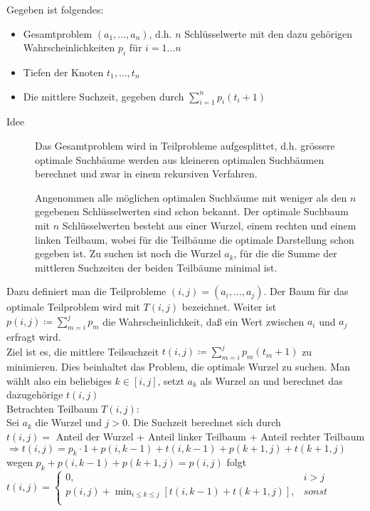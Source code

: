\documentclass[ngerman,draft,parskip=half*,twoside]{scrreprt}
\theoremstyle{break}
\theoremstyle{nonumberbreak}
\begin{document}
Gegeben ist folgendes:
\begin{itemize}
    \item Gesamtproblem $(a_1, \dots,a_n)$, d.h. $n$ Schlüsselwerte mit den dazu gehörigen Wahrscheinlichkeiten $p_i$ für $i=1 \dots n$
    \item Tiefen der Knoten $t_1,\dots,t_n$
    \item Die mittlere Suchzeit, gegeben durch $\sum_{i=1}^n p_i(t_i+1)$
\end{itemize}
\begin{description}
    \item[Idee] Das Gesamtproblem wird in Teilprobleme aufgesplittet, d.h. grössere optimale Suchbäume werden
     aus kleineren optimalen Suchbäumen  berechnet und zwar in einem rekursiven Verfahren.
     
     Angenommen alle möglichen optimalen Suchbäume mit weniger als den $n$ gegebenen Schlüsselwerten sind schon bekannt.
     Der optimale Suchbaum mit $n$ Schlüsselwerten besteht aus einer Wurzel, einem rechten und einem linken Teilbaum, wobei
     für die Teilbäume die optimale Darstellung schon gegeben ist. Zu suchen ist noch die Wurzel $a_k$, für die die
     Summe der mittleren Suchzeiten der beiden Teilbäume minimal ist.
\end{description}
Dazu definiert man die Teilprobleme $(i,j)=(a_i,\dots,a_j)$. Der Baum für das optimale Teilproblem wird mit $T(i,j)$
bezeichnet. Weiter ist $p(i,j)\coloneqq \sum_{m=i}^j p_m$ die Wahrscheinlichkeit, daß ein Wert zwischen $a_i$ und $a_j$
erfragt wird.\\ Ziel ist es, die mittlere Teilsuchzeit $t(i,j)\coloneqq \sum_{m=i}^j p_m(t_m+1)$ zu minimieren. Dies beinhaltet
das Problem, die optimale Wurzel zu suchen. Man wählt also ein beliebiges $k\in [i,j]$, setzt $a_k$ als Wurzel
an und berechnet das dazugehörige $t(i,j)$ \\
Betrachten Teilbaum $T(i,j)$:\\ Sei $a_k$ die Wurzel und $j>0$. Die Suchzeit berechnet sich durch\\
$t(i,j)=$ Anteil der Wurzel + Anteil linker Teilbaum + Anteil rechter Teilbaum
$\Rightarrow t(i,j)=p_k\cdot 1+p(i,k-1)+t(i,k-1)+p(k+1,j)+t(k+1,j)$
wegen $p_k+p(i,k-1)+p(k+1,j)=p(i,j)$ folgt
$t(i,j)=\left\{\begin{array}{ll}
    0, & i>j \\
    p(i,j)+ \min_{i\leq k\leq j}[t(i,k-1)+t(k+1,j)], & sonst \\ \end{array}\right.    $
\end{document}
